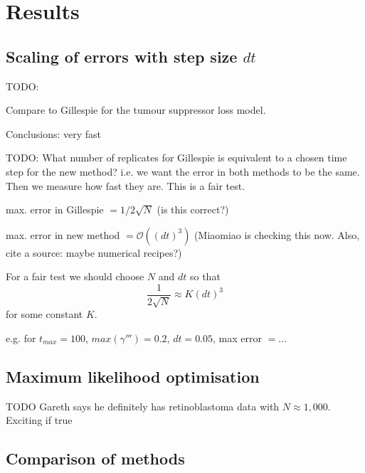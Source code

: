 \documentclass{article}
\begin{document}
\section{Results}

\subsection{Scaling of errors with step size $dt$}

TODO:

Compare to Gillespie for the tumour suppressor loss model.

  Conclusions: very fast

%

TODO: What number of replicates for Gillespie is equivalent to a chosen
time step for the new method? i.e. we want the error in both methods to be the
same. Then we measure how fast they are. This is a fair test.

max. error in Gillespie $= 1 / 2 \sqrt{N}$ (is this correct?)

max. error in new method $= \mathcal{O}((dt)^3)$ (Miaomiao is checking this
now. Also, cite a source: maybe numerical recipes?)

For a fair test we should choose $N$ and $dt$ so that
\begin{equation}
    \frac{1}{2\sqrt{N}} \approx K (dt)^3
\end{equation}
for some constant $K$.

e.g. for $t_{max} = 100$, $max(\gamma''') = 0.2$, $dt = 0.05$, max error $ = ...$


\subsection{Maximum likelihood optimisation}


TODO Gareth says he definitely has retinoblastoma data with $N\approx1,000$.
Exciting if true

\subsection{Comparison of methods}
\end{document}
